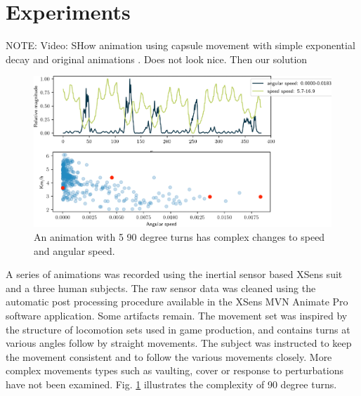 \section{Experiments}

NOTE: Video: SHow animation using capsule movement with simple exponential decay and original animations . Does not look nice. Then our solution
\begin{figure}
    \centering
    \includegraphics[width=1.0\columnwidth]{img/movement_stats.png}
    \caption{An animation with 5 90 degree turns has complex changes to speed and angular speed.}
    \label{fig:results:trajectory_estimation}
\end{figure}

A series of animations was recorded using the inertial sensor based XSens suit and a three human subjects. The raw sensor data was cleaned using the automatic post processing procedure available in the XSens MVN Animate Pro software application. Some artifacts remain.
The movement set was inspired by the structure of locomotion sets used in game production, and contains turns at various angles follow by straight movements. The subject was instructed to keep the movement consistent and to follow the various movements closely. More complex movements types such as vaulting, cover or response to perturbations have not been examined. Fig. \ref{fig:results:trajectory_estimation} illustrates the complexity of 90 degree turns. 

